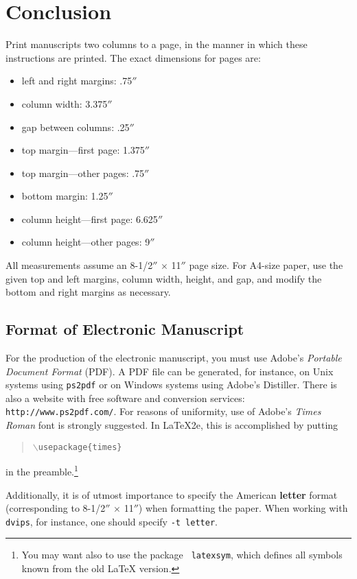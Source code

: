 \documentclass{article}
\begin{document}
\section{Conclusion}

Print manuscripts two columns to a page, in the manner in which these
instructions are printed. The exact dimensions for pages are:
\begin{itemize}
\item left and right margins: .75$''$
\item column width: 3.375$''$
\item gap between columns: .25$''$
\item top margin---first page: 1.375$''$
\item top margin---other pages: .75$''$
\item bottom margin: 1.25$''$
\item column height---first page: 6.625$''$
\item column height---other pages: 9$''$
\end{itemize}

All measurements assume an 8-1/2$''$ $\times$ 11$''$ page size. For
A4-size paper, use the given top and left margins, column width,
height, and gap, and modify the bottom and right margins as necessary.

\subsection{Format of Electronic Manuscript}

For the production of the electronic manuscript, you must use Adobe's
{\em Portable Document Format} (PDF). A PDF file can be generated, for
instance, on Unix systems using {\tt ps2pdf} or on Windows systems
using Adobe's Distiller. There is also a website with free software
and conversion services: {\tt http://www.ps2pdf.com/}. For reasons of
uniformity, use of Adobe's {\em Times Roman} font is strongly suggested. In
\LaTeX2e{}, this is accomplished by putting
\begin{quote} 
\mbox{\tt $\backslash$usepackage\{times\}}
\end{quote}
in the preamble.\footnote{You may want also to use the package {\tt
latexsym}, which defines all symbols known from the old \LaTeX{}
version.}
  
Additionally, it is of utmost importance to specify the American {\bf
letter} format (corresponding to 8-1/2$''$ $\times$ 11$''$) when
formatting the paper. When working with {\tt dvips}, for instance, one
should specify {\tt -t letter}.
\end{document}
